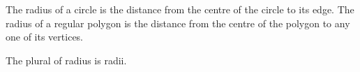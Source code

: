 The radius of a circle is the distance from the centre of the circle to its edge.
The radius of a regular polygon is the distance from the centre
of the polygon to any one of its vertices.
\par
The plural of radius is radii.